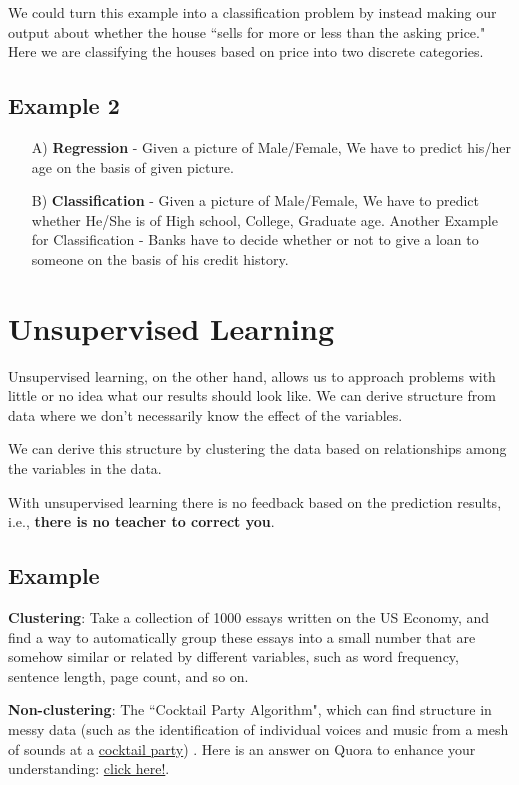 We could turn this example into a classification problem by instead making our output about whether the house ``sells for more or less than the asking price." Here we are classifying the houses based on price into two discrete categories.
\subsection*{Example 2}
\begin{itemize}
	\item[A)] {\bf Regression} - Given a picture of Male/Female, We have to predict his/her age on the basis of given picture.
	\item[B)] {\bf Classification}  - Given a picture of Male/Female, We have to predict whether He/She is of High school, College, Graduate age. Another Example for Classification - Banks have to decide whether or not to give a loan to someone on the basis of his credit history.
\end{itemize}
\section*{Unsupervised Learning}
Unsupervised learning, on the other hand, allows us to approach problems with little or no idea what our results should look like. We can derive structure from data where we don't necessarily know the effect of the variables.

We can derive this structure by clustering the data based on relationships among the variables in the data.

With unsupervised learning there is no feedback based on the prediction results, i.e., {\bf there is no teacher to correct you}.
\subsection*{Example}
{\bf Clustering}: Take a collection of 1000 essays written on the US Economy, and find a way to automatically group these essays into a small number that are somehow similar or related by different variables, such as word frequency, sentence length, page count, and so on.

{\bf Non-clustering}: The ``Cocktail Party Algorithm", which can find structure in messy data (such as the identification of individual voices and music from a mesh of sounds at a \href{https://en.wikipedia.org/wiki/Cocktail_party_effect}{cocktail party}) . Here is an answer on Quora to enhance your understanding: \href{https://www.quora.com/What-is-the-difference-between-supervised-and-unsupervised-learning-algorithms}{click here!}.

